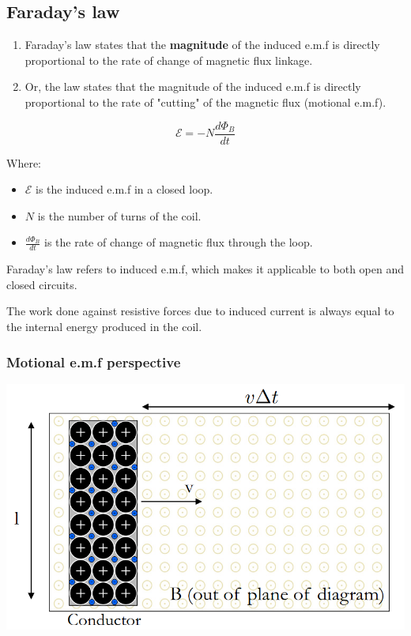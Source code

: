 \documentclass[11pt]{article}
\begin{document}
\subsection{Faraday's law}
\label{sec:orga4aceb5}
\begin{enumerate}
\item Faraday's law states that the \textbf{magnitude} of the induced e.m.f is directly proportional to the rate of change of magnetic flux linkage.
\item Or, the law states that the magnitude of the induced e.m.f is directly proportional to the rate of "cutting" of the magnetic flux (motional e.m.f).
\end{enumerate}

\[\mathcal{E} = - N \frac{d \Phi_B}{dt}\]

Where:
\begin{itemize}
\item \(\mathcal{E}\) is the induced e.m.f in a closed loop.
\item \(N\) is the number of turns of the coil.
\item \(\frac{d \Phi_B}{dt}\) is the rate of change of magnetic flux through the loop.
\end{itemize}

Faraday's law refers to induced e.m.f, which makes it applicable to both open and closed circuits.


The work done against resistive forces due to induced current is always equal to the internal energy produced in the coil.

\newpage
\subsubsection{Motional e.m.f perspective}
\label{sec:org995f33f}

\begin{center}
\includegraphics[scale=0.65]{./images/motional-emf.png}
\end{center}
\end{document}
